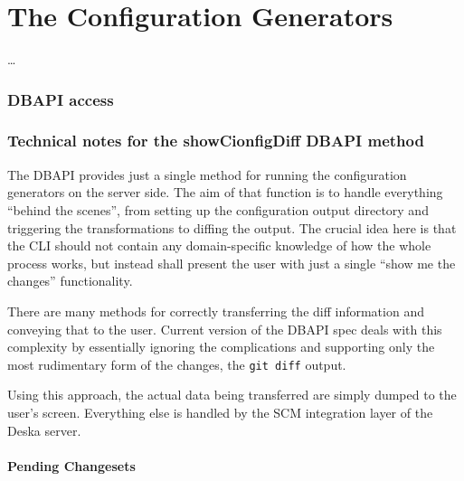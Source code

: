 \documentclass[deska]{subfiles}
\begin{document}
\chapter{The Configuration Generators}
\label{sec:config-generators}

\begin{abstract}
\end{abstract}

\ldots

\subsection{DBAPI access}


\subsection{Technical notes for the showCionfigDiff DBAPI method}

The DBAPI provides just a single method for running the configuration generators on the server side.  The aim of that
function is to handle everything ``behind the scenes'', from setting up the configuration output directory and
triggering the transformations to diffing the output.  The crucial idea here is that the CLI should not contain any
domain-specific knowledge of how the whole process works, but instead shall present the user with just a single ``show
me the changes'' functionality.

There are many methods for correctly transferring the diff information and conveying that to the user.  Current version
of the DBAPI spec deals with this complexity by essentially ignoring the complications and supporting only the most
rudimentary form of the changes, the {\tt git diff} output.

Using this approach, the actual data being transferred are simply dumped to the user's screen.  Everything else is
handled by the SCM integration layer of the Deska server.

\subsubsection{Pending Changesets}
\end{document}
